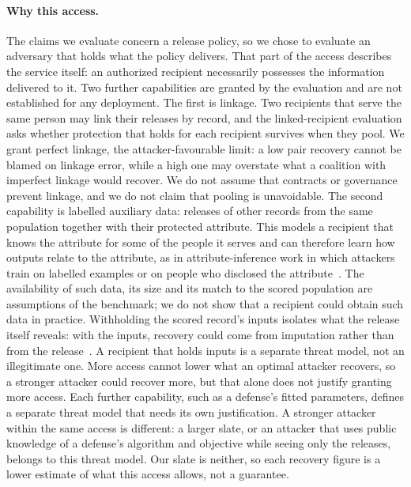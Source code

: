 \documentclass[10pt]{article}
\begin{document}
\paragraph{Why this access.} The claims we evaluate concern a release policy, so we chose to evaluate an adversary that
holds what the policy delivers. That part of the access describes the service itself: an authorized recipient necessarily possesses the
information delivered to it. Two further capabilities are granted by the evaluation and are
not established for any deployment. The first is linkage. Two recipients that serve the same person may link their
releases by record, and the linked-recipient evaluation asks whether protection that holds for each recipient survives
when they pool. We grant perfect linkage, the attacker-favourable limit: a low pair recovery cannot be blamed on linkage
error, while a high one may overstate what a coalition with imperfect linkage would recover. We do not assume that
contracts or governance prevent linkage, and we do not claim that pooling is unavoidable. The second capability is
labelled auxiliary data: releases of other records from the same population together with their protected attribute.
This models a recipient that knows the attribute for some of the people it serves and can therefore learn how outputs
relate to the attribute, as in attribute-inference work in which attackers train on labelled examples or on people who
disclosed the attribute~\citep{song2020overlearning,jia2018attriguard}. The availability of such data, its size and its
match to the scored population are assumptions of the benchmark; we do not show that a recipient could obtain such data
in practice. Withholding the scored record's inputs isolates what the release itself reveals: with the inputs, recovery
could come from imputation rather than from the release~\citep{jayaraman2022imputation}. A recipient that holds inputs
is a separate threat model, not an illegitimate one. More access cannot lower what an optimal attacker recovers, so a
stronger attacker could recover more, but that alone does not justify granting more access. Each further capability,
such as a defense's fitted parameters, defines a separate threat model that needs its own justification. A stronger
attacker within the same access is different: a larger slate, or an attacker that uses public knowledge of a defense's
algorithm and objective while seeing only the releases, belongs to this threat model. Our slate is neither, so each
recovery figure is a lower estimate of what this access allows, not a guarantee.
\end{document}
